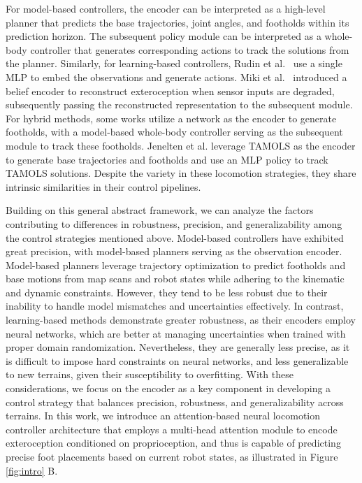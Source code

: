\documentclass[9pt,twocolumn,twoside]{osajnl}
\begin{document}
For model-based controllers, the encoder can be interpreted as a high-level planner that predicts the base trajectories, joint angles, and footholds within its prediction horizon. The subsequent policy module can be interpreted as a whole-body controller that generates corresponding actions to track the solutions from the planner. Similarly, for learning-based controllers, Rudin et al.~\cite{Rudin2021} use a single MLP to embed the observations and generate actions. Miki et al.~\cite{Miki2022} introduced a belief encoder to reconstruct exteroception when sensor inputs are degraded, subsequently passing the reconstructed representation to the subsequent module. For hybrid methods, some works\cite{Tsounis2020, RLOC} utilize a network as the encoder to generate footholds, with a model-based whole-body controller serving as the subsequent module to track these footholds. Jenelten et al.\cite{jenelten2023dtc} leverage TAMOLS as the encoder to generate base trajectories and footholds and use an MLP policy to track TAMOLS solutions. Despite the variety in these locomotion strategies, they share intrinsic similarities in their control pipelines. 

Building on this general abstract framework, we can analyze the factors contributing to differences in robustness, precision, and generalizability among the control strategies mentioned above. Model-based controllers have exhibited great precision, with model-based planners serving as the observation encoder. Model-based planners leverage trajectory optimization to predict footholds and base motions from map scans and robot states while adhering to the kinematic and dynamic constraints. However, they tend to be less robust due to their inability to handle model mismatches and uncertainties effectively. In contrast, learning-based methods demonstrate greater robustness, as their encoders employ neural networks, which are better at managing uncertainties when trained with proper domain randomization. Nevertheless, they are generally less precise, as it is difficult to impose hard constraints on neural networks, and less generalizable to new terrains, given their susceptibility to overfitting. With these considerations, we focus on the encoder as a key component in developing a control strategy that balances precision, robustness, and generalizability across terrains. In this work, we introduce an attention-based neural locomotion controller architecture that employs a multi-head attention module to encode exteroception conditioned on proprioception, and thus is capable of predicting precise foot placements based on current robot states, as illustrated in Figure \ref{fig:intro} B.
\end{document}
